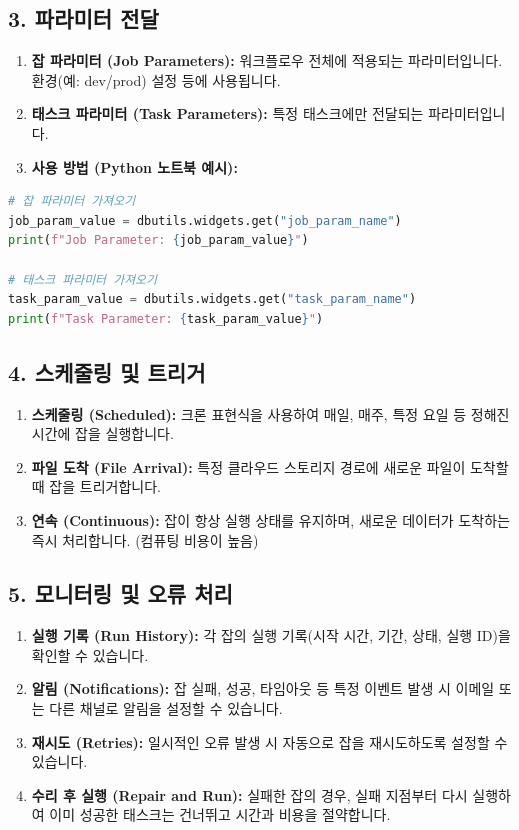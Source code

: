 \documentclass[11pt,a4paper]{article}
\theoremstyle{definition}
\begin{document}
\subsection*{3. 파라미터 전달}
\begin{enumerate}
    \item \textbf{잡 파라미터 (Job Parameters):} 워크플로우 전체에 적용되는 파라미터입니다. 환경(예: dev/prod) 설정 등에 사용됩니다.
    \item \textbf{태스크 파라미터 (Task Parameters):} 특정 태스크에만 전달되는 파라미터입니다.
    \item \textbf{사용 방법 (Python 노트북 예시):}
\end{enumerate}
\begin{lstlisting}[language=Python, caption={Databricks 노트북에서 파라미터 사용 예시}, label={lst:param_example}]
# 잡 파라미터 가져오기
job_param_value = dbutils.widgets.get("job_param_name")
print(f"Job Parameter: {job_param_value}")

# 태스크 파라미터 가져오기
task_param_value = dbutils.widgets.get("task_param_name")
print(f"Task Parameter: {task_param_value}")
\end{lstlisting}

\subsection*{4. 스케줄링 및 트리거}
\begin{enumerate}
    \item \textbf{스케줄링 (Scheduled):} 크론 표현식을 사용하여 매일, 매주, 특정 요일 등 정해진 시간에 잡을 실행합니다.
    \item \textbf{파일 도착 (File Arrival):} 특정 클라우드 스토리지 경로에 새로운 파일이 도착할 때 잡을 트리거합니다.
    \item \textbf{연속 (Continuous):} 잡이 항상 실행 상태를 유지하며, 새로운 데이터가 도착하는 즉시 처리합니다. (컴퓨팅 비용이 높음)
\end{enumerate}

\subsection*{5. 모니터링 및 오류 처리}
\begin{enumerate}
    \item \textbf{실행 기록 (Run History):} 각 잡의 실행 기록(시작 시간, 기간, 상태, 실행 ID)을 확인할 수 있습니다.
    \item \textbf{알림 (Notifications):} 잡 실패, 성공, 타임아웃 등 특정 이벤트 발생 시 이메일 또는 다른 채널로 알림을 설정할 수 있습니다.
    \item \textbf{재시도 (Retries):} 일시적인 오류 발생 시 자동으로 잡을 재시도하도록 설정할 수 있습니다.
    \item \textbf{수리 후 실행 (Repair and Run):} 실패한 잡의 경우, 실패 지점부터 다시 실행하여 이미 성공한 태스크는 건너뛰고 시간과 비용을 절약합니다.
\end{enumerate}
\end{document}
